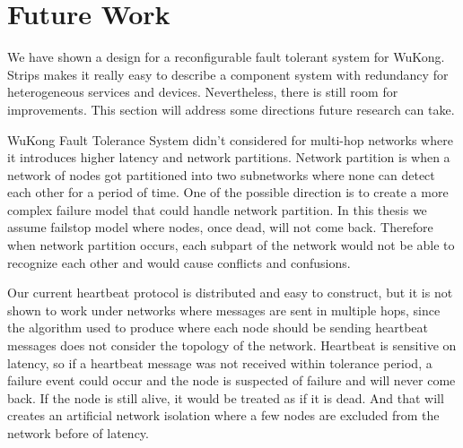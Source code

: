 \section{Future Work}



We have shown a design for a reconfigurable fault tolerant system for WuKong.
Strips makes it really easy to describe a component system with redundancy for
heterogeneous services and devices. Nevertheless, there is still room for
improvements. This section will address some directions future research can take.

WuKong Fault Tolerance System didn't considered for multi-hop networks where it
introduces higher latency and network partitions.  Network partition is when
a network of nodes got partitioned into two subnetworks where none can detect
each other for a period of time. One of the possible direction is to create
a more complex failure model that could handle network partition. In this thesis
we assume failstop model where nodes, once dead, will not come back. Therefore
when network partition occurs, each subpart of the network would not be able to
recognize each other and would cause conflicts and confusions.

Our current heartbeat protocol is distributed and easy to construct, but it is
not shown to work under networks where messages are sent in multiple hops, since
the algorithm used to produce where each node should be sending heartbeat
messages does not consider the topology of the network. Heartbeat is sensitive
on latency, so if a heartbeat message was not received within tolerance period,
a failure event could occur and the node is suspected of failure and will
never come back. If the node is still alive, it would be treated as if it is
dead. And that will creates an artificial network isolation where a few nodes
are excluded from the network before of latency.

